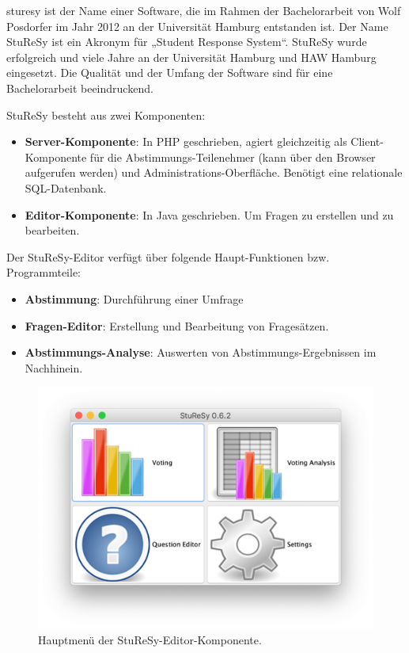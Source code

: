 \ac{sturesy} ist der Name einer Software, die im Rahmen der Bachelorarbeit von Wolf Posdorfer im Jahr 2012 an der Universität Hamburg entstanden ist. Der Name StuReSy ist ein Akronym für „Student Response System“. StuReSy wurde erfolgreich und viele Jahre an der Universität Hamburg und HAW Hamburg eingesetzt. Die Qualität und der Umfang der Software sind für eine Bachelorarbeit beeindruckend.

StuReSy besteht aus zwei Komponenten:
\begin{itemize}
    \item \textbf{Server-Komponente}: In PHP geschrieben, agiert gleichzeitig als Client-Komponente für die Abstimmungs-Teilenehmer (kann über den Browser aufgerufen werden) und Administrations-Oberfläche. Benötigt eine relationale SQL-Datenbank.
    \item \textbf{Editor-Komponente}: In Java geschrieben. Um Fragen zu erstellen und zu bearbeiten.
\end{itemize}

Der StuReSy-Editor verfügt über folgende Haupt-Funktionen bzw. Programmteile:
\begin{itemize}
    \item \textbf{Abstimmung}: Durchführung einer Umfrage
    \item \textbf{Fragen-Editor}: Erstellung und Bearbeitung von Fragesätzen.
    \item \textbf{Abstimmungs-Analyse}: Auswerten von Abstimmungs-Ergebnissen im Nachhinein.
\end{itemize}

\begin{figure}[H]
    \includegraphics[width=16cm]{chapter/bewertung/bilder/StuReSy_Hauptmenue.png}
    \centering
    \caption{Hauptmenü der StuReSy-Editor-Komponente.}
    \label{Abbildung 2.1}
\end{figure}



